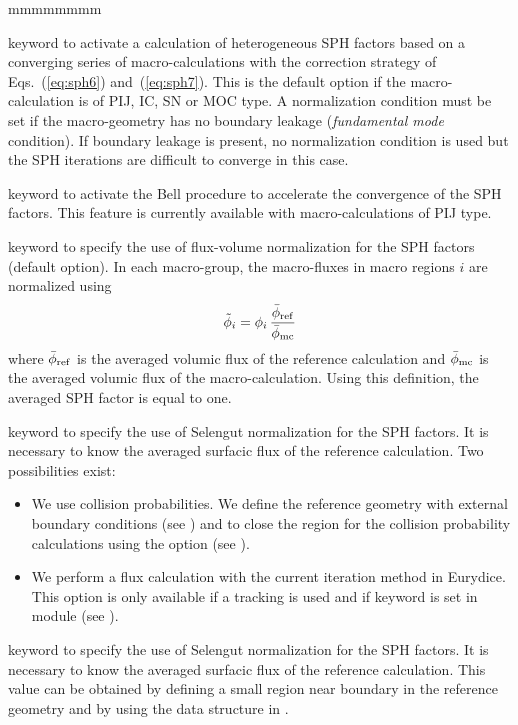 \begin{ListeDeDescription}{mmmmmmmm}
\item[\moc{SN}] keyword to activate a calculation of heterogeneous SPH factors based on a converging series of
macro-calculations with the correction strategy of Eqs.~(\ref{eq:sph6}) and~(\ref{eq:sph7}). This is the default option
if the macro-calculation is of PIJ, IC, SN or MOC type. A normalization condition must be set if the macro-geometry
has no boundary leakage ({\sl fundamental mode} condition). If boundary leakage is present, no normalization condition
is used but the SPH iterations are difficult to converge in this case.

\item[\moc{BELL}] keyword to activate the Bell procedure to accelerate the convergence of the SPH factors. This feature is currently
available with macro-calculations of PIJ type.\cite{madrid2}

\item[\moc{STD}] keyword to specify the use of flux-volume normalization for the SPH factors (default option). In each macro-group, the macro-fluxes
in macro regions $i$ are normalized using
$$
\tilde\phi_i=\phi_i\,{\bar\phi_{\rm ref}\over \bar\phi_{\rm mc}}
$$
\noindent where $\bar\phi_{\rm ref}$ is the averaged volumic flux of the reference calculation and $\bar\phi_{\rm mc}$ is the averaged volumic flux of the macro-calculation. Using this definition, the averaged SPH factor is equal to one.

\item[\moc{SELE\_ALB}] keyword to specify the use of Selengut normalization for the SPH factors. It is necessary to know the averaged surfacic flux of the reference calculation. Two possibilities exist:
\begin{itemize}
\item We use collision probabilities. We define the reference geometry with 
external boundary conditions (see ) and to close the region for the collision probability calculations using the  option (see ).
\item We perform a flux calculation with the current iteration method in Eurydice. This option is only available if a  tracking is used and if
keyword  is set in module  (see ).
\end{itemize}

\item[\moc{SELE\_FD}] keyword to specify the use of Selengut normalization for the SPH factors. It is necessary to know the averaged surfacic flux of the reference calculation. This value can be obtained by defining
a small region near boundary in the reference geometry and by using the  data structure in .


\end{ListeDeDescription}
